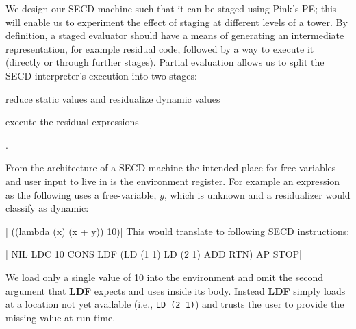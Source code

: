 \documentclass[a4paper,12pt,twoside,openright]{report}
\theoremstyle{definition}
\begin{document}
We design our SECD machine such that it can be staged using Pink's PE; this will enable us to experiment the effect of staging at different levels of a tower. By definition, a staged evaluator should have a means of generating an intermediate representation, for example residual code, followed by a way to execute it (directly or through further stages). Partial evaluation allows us to split the SECD interpreter's execution into two stages:
\begin{enumerate*}[label=(\arabic*)]
    \item reduce static values and residualize dynamic values
    \item execute the residual expressions
\end{enumerate*}.

From the architecture of a SECD machine the intended place for free variables and user input to live in is the environment register. For example an expression as the following uses a free-variable, $y$, which is unknown and a residualizer would classify as dynamic:

|    ((lambda (x) (x + y)) 10)|
This would translate to following SECD instructions:

|   NIL LDC 10 CONS LDF (LD (1 1) LD (2 1) ADD RTN) AP STOP|

We load only a single value of 10 into the environment and omit the second argument that \textbf{LDF} expects and uses inside its body. Instead \textbf{LDF} simply loads at a location not yet available (i.e., \mbox{\texttt{LD (2 1)}}) and trusts the user to provide the missing value at run-time.
\end{document}
